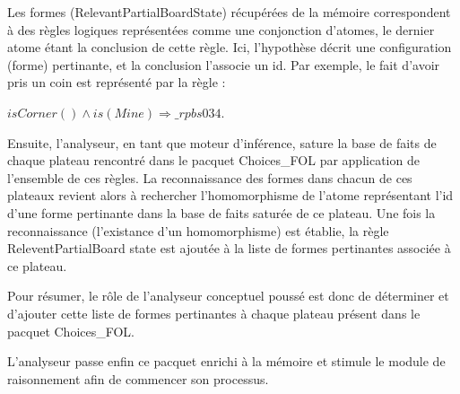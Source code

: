 Les formes (RelevantPartialBoardState) récupérées de la mémoire correspondent à des règles logiques représentées comme une conjonction d'atomes, le dernier atome étant la conclusion de cette règle. Ici, l'hypothèse décrit une configuration (forme) pertinante, et la conclusion l'associe un id. Par exemple, le fait d'avoir pris un coin est représenté par la règle :

\textit{$isCorner() \wedge is(Mine) \Longrightarrow \_rpbs034$}. 

Ensuite, l'analyseur, en tant que moteur d'inférence, sature la base de faits de chaque plateau rencontré dans le pacquet Choices\_FOL par application de l'ensemble de ces règles. La reconnaissance des formes dans chacun de ces plateaux revient alors à rechercher l'homomorphisme de l'atome représentant l'id d'une forme pertinante dans la base de faits saturée de ce plateau. Une fois la reconnaissance (l'existance d'un homomorphisme) est établie, la règle ReleventPartialBoard state est ajoutée à la liste de formes pertinantes associée à ce plateau.

Pour résumer, le rôle de l'analyseur conceptuel poussé est donc de déterminer et d'ajouter cette liste de formes pertinantes à chaque plateau présent dans le pacquet Choices\_FOL. 

L'analyseur passe enfin ce pacquet enrichi à la mémoire et stimule le module de raisonnement afin de commencer son processus. 